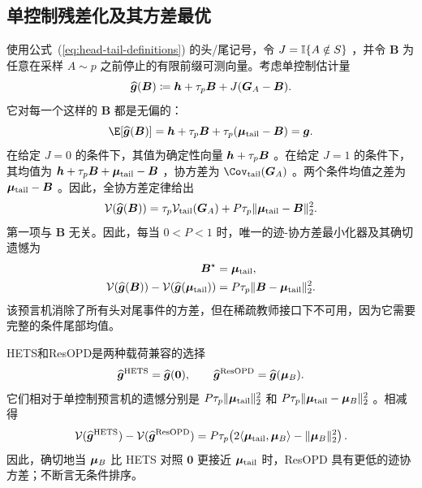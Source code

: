 \subsection{单控制残差化及其方差最优}
\label{app:single-control}

使用公式~(\ref{eq:head-tail-definitions}) 的头/尾记号，令
$J=\mathbb{I}\{A\notin S\}$ ，并令 $\bm B$ 为任意在采样 $A\sim p$ 之前停止的有限前缀可测向量。考虑单控制估计量
\begin{equation}
 \widehat{\bm{g}}(\bm B)
 \coloneqq
 \bm{h}+\tau_p\bm B+J(\bm{G}_A-\bm B).
 \label{eq:single-control-estimator}
\end{equation}
它对每一个这样的 $\bm B$ 都是无偏的：
\begin{equation}
 \E[\widehat{\bgrad}(\bm B)]
 =\bhead+\tau_p\bm B
  +\tau_p(\bmean_{\mathrm{tail}}-\bm B)
 =\bgrad.
 \label{eq:single-control-unbiased}
\end{equation}
在给定 $J=0$ 的条件下，其值为确定性向量
$\bm{h}+\tau_p\bm B$ 。在给定 $J=1$ 的条件下，其均值为
$\bm{h}+\tau_p\bm B+\bm{\mu}_{\mathrm{tail}}-\bm B$ ，协方差为
$\Cov_{\mathrm{tail}}(\btoken_A)$ 。两个条件均值之差为
$\bm{\mu}_{\mathrm{tail}}-\bm B$ 。因此，全协方差定律给出
\begin{equation}
 \mathcal V(\widehat{\bm{g}}(\bm B))
 =\tau_p\mathcal V_{\mathrm{tail}}(\bm{G}_A)
 +P\tau_p\lVert\bm{\mu}_{\mathrm{tail}}-\bm B\rVert_2^2.
 \label{eq:single-control-variance}
\end{equation}
第一项与 $\bm B$ 无关。因此，每当
$0<P<1$ 时，唯一的迹-协方差最小化器及其确切遗憾为
\begin{equation}
 \begin{aligned}
 \bm B^\star&=\bm{\mu}_{\mathrm{tail}},\\
 \mathcal V(\widehat{\bm{g}}(\bm B))
 -\mathcal V(\widehat{\bm{g}}(\bm{\mu}_{\mathrm{tail}}))
 &=P\tau_p\lVert\bm B-\bm{\mu}_{\mathrm{tail}}\rVert_2^2.
 \end{aligned}
 \label{eq:single-control-oracle}
\end{equation}
该预言机消除了所有头对尾事件的方差，但在稀疏教师接口下不可用，因为它需要完整的条件尾部均值。

HETS和ResOPD是两种载荷兼容的选择
\begin{equation}
 \widehat{\bm{g}}^{\mathrm{HETS}}=\widehat{\bm{g}}(\bm 0),
 \qquad
 \widehat{\bm{g}}^{\mathrm{ResOPD}}=\widehat{\bm{g}}(\bm{\mu}_B).
\end{equation}
它们相对于单控制预言机的遗憾分别是
$P\tau_p\lVert\bm{\mu}_{\mathrm{tail}}\rVert_2^2$  和
$P\tau_p\lVert\bm{\mu}_{\mathrm{tail}}-\bm{\mu}_B\rVert_2^2$ 。相减得
\begin{equation}
  \mathcal{V}(\widehat{\bm{g}}^{\mathrm{HETS}}) - \mathcal{V}(\widehat{\bm{g}}^{\mathrm{ResOPD}}) = P\tau_p \!\left( 2\langle\bm{\mu}_{\mathrm{tail}}, \bm{\mu}_B\rangle - \lVert\bm{\mu}_B\rVert_2^2 \right).
  \label{eq:hets-cfr-variance-appendix}
\end{equation}
因此，确切地当 $\bm{\mu}_B$ 比 HETS 对照 $\bm 0$ 更接近 $\bm{\mu}_{\mathrm{tail}}$ 时，ResOPD 具有更低的迹协方差；不断言无条件排序。

